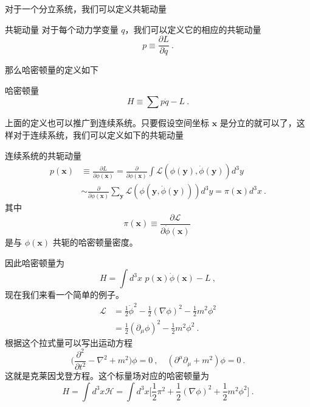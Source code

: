 对于一个分立系统，我们可以定义共轭动量
\begin{definition}{共轭动量}
对于每个动力学变量 $q$，我们可以定义它的相应的共轭动量
\begin{equation}
p \equiv \frac{\partial L}{\partial \dot q}~.
\end{equation}
\end{definition}
那么哈密顿量的定义如下
\begin{definition}{哈密顿量}
\begin{equation}\label{eq_classi_1}
H \equiv \sum p \dot q - L~.
\end{equation}
\end{definition}
上面的定义也可以推广到连续系统。只要假设空间坐标 $\mathbf x$ 是分立的就可以了，这样对于连续系统，我们可以定义如下的共轭动量
\begin{definition}{连续系统的共轭动量}
\begin{equation}
\begin{aligned}
p(\mathbf x) & \equiv \frac{\partial L}{\partial \dot \phi(\mathbf x)} = \frac{\partial}{\partial \dot \phi(\mathbf x)} \int \mathcal L(\phi(\mathbf y),\dot \phi(\mathbf y)) d^3 y \\
& \sim \frac{\partial}{\partial \dot \phi(\mathbf x)} \sum_{\mathbf y} \mathcal L(\phi(\mathbf y,\dot \phi(\mathbf y))) d^3 y=\pi(\mathbf x) d^3 x~.
\end{aligned}
\end{equation}
其中
\begin{equation}
\pi(\mathbf x) \equiv \frac{\partial \mathcal L}{\partial \dot \phi(\mathbf x)}~
\end{equation}
是与 $\phi(\mathbf x)$ 共轭的哈密顿量密度。
\end{definition}
因此哈密顿量为
\begin{equation}
H = \int d^3 x\,\, p(\mathbf x) \dot \phi(\mathbf x) - L~,
\end{equation}
现在我们来看一个简单的例子。
\begin{align}\nonumber
\mathcal L & = \frac{1}{2} \dot \phi^2 - \frac{1}{2} (\nabla \phi)^2 - \frac{1}{2} m^2 \phi^2 \\
& = \frac{1}{2} (\partial_\mu\phi)^2 - \frac{1}{2} m^2 \phi^2~.
\end{align}
根据这个拉式量可以写出运动方程
\begin{equation}
\bigg( \frac{\partial^2}{\partial t^2} - \nabla^2 +m^2 \bigg)\phi = 0~,\quad (\partial^\mu\partial_\mu+m^2)\phi = 0~.
\end{equation}
这就是克莱因戈登方程。这个标量场对应的哈密顿量为
\begin{equation}
H =  \int d^3x \mathcal H = \int d^3 x \bigg[ \frac{1}{2} \pi^2 + \frac{1}{2} (\nabla \phi)^2 + \frac{1}{2} m^2 \phi^2 \bigg] ~.
\end{equation} 

